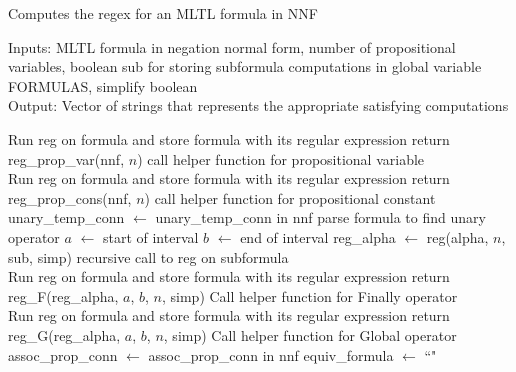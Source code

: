 \documentclass[runningheads]{llncs}
\begin{document}
\begin{algorithm}[H]
\caption{Computes the regex for an MLTL formula in NNF}
Inputs: MLTL formula in negation normal form, number of propositional variables, boolean sub for storing subformula computations in global variable FORMULAS, simplify boolean\\
Output: Vector of strings that represents the appropriate satisfying computations
\begin{algorithmic}

            \State Run reg on formula and store formula with its regular expression
        \EndIf
        \State return reg\_prop\_var(nnf, $n$)
        \Comment call helper function for propositional variable
    \EndIf\\
            \State Run reg on formula and store formula with its regular expression
        \EndIf
        \State return reg\_prop\_cons(nnf, $n$)
        \Comment call helper function for propositional constant
    \EndIf
    \\
        \State unary\_temp\_conn $\leftarrow$ unary\_temp\_conn in nnf
        \Comment parse formula to find unary operator
        \State $a$ $\leftarrow$ start of interval
        \State $b$ $\leftarrow$ end of interval
        \State reg\_alpha $\leftarrow$ reg(alpha, $n$, sub, simp)
        \Comment recursive call to reg on subformula\\
                \State Run reg on formula and store formula with its regular expression
            \EndIf
            \State return reg\_F(reg\_alpha, $a$, $b$, $n$, simp)
            \Comment Call helper function for Finally operator
        \EndIf\\
                \State Run reg on formula and store formula with its regular expression
            \EndIf
            \State return reg\_G(reg\_alpha, $a$, $b$, $n$, simp)
            \Comment Call helper function for Global operator
        \EndIf
    \EndIf
    \\
        \State assoc\_prop\_conn $\leftarrow$ assoc\_prop\_conn in nnf
        \State equiv\_formula $\leftarrow$ ``" 

\end{algorithmic}
\end{algorithm}
\end{document}
